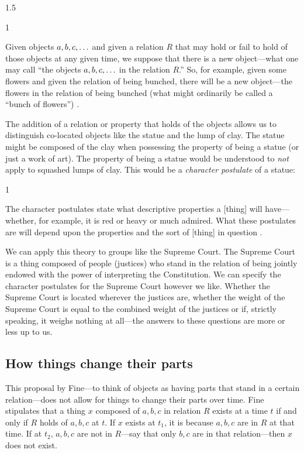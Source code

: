 \documentclass[11pt]{article}
\newenvironment{squote}{%
\begin{spacing}{1}
\begin{list}{}{%
\setlength{\labelwidth}{0pt}%
\rightmargin\leftmargin%
}
\item\relax
}{%
\end{list}%
\end{spacing}
}
\begin{document}
\begin{spacing}{1.5}
\begin{squote}
Given objects $a, b, c, \mathellipsis $ and given a relation $R$ that
may hold or fail to hold of those objects at any given time, we
suppose that there is a new object---what one may call ``the objects
$a, b, c, \mathellipsis $ in the relation $R$.''  So, for example,
given some flowers and given the relation of being bunched, there will
be a new object---the flowers in the relation of being bunched (what
might ordinarily be called a ``bunch of flowers'')
\citeyearpar[65]{fine1999}.
\end{squote}

The addition of a relation or property that holds of the objects
allows us to distinguish co-located objects like the statue and the
lump of clay.  The statue might be composed of the clay when
possessing the property of being a statue (or just a work of art).
The property of being a statue would be understood to {\em not} apply
to squashed lumps of clay.  This would be a {\em character postulate}
of a statue:

\begin{squote}
The character postulates state what descriptive properties a [thing]
will have---whether, for example, it is red or heavy or much admired.
What these postulates are will depend upon the properties and the sort
of [thing] in question \citep[67]{fine1999}.
\end{squote}

We can apply this theory to groups like the Supreme Court.  The
Supreme Court is a thing composed of people (justices) who stand in
the relation of being jointly endowed with the power of interpreting
the Constitution.  We can specify the character postulates for the
Supreme Court however we like.  Whether the Supreme Court is located
wherever the justices are, whether the weight of the Supreme Court is
equal to the combined weight of the justices or if, strictly speaking,
it weighs nothing at all---the answers to these questions are more or
less up to us.

\subsection{How things change their parts}
\label{h-part}
This proposal by Fine---to think of objects as having parts that stand
in a certain relation---does not allow for things to change their
parts over time.  Fine stipulates that a thing $x$ composed of $a, b,
c$ in relation $R$ exists at a time $t$ if and only if $R$ holds of
$a, b, c$ at $t$.  If $x$ exists at $t_1$, it is because $a, b, c$ are
in $R$ at that time.  If at $t_2$, $a, b, c$ are not in $R$---say that
only $b, c$ are in that relation---then $x$ does not exist.


\end{spacing}
\end{document}
